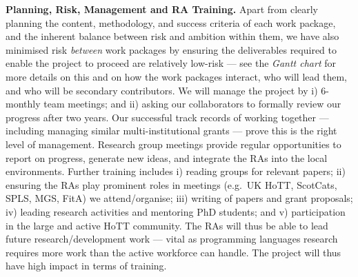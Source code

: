 \documentclass[a4paper,11pt]{article}
\newcommand{\eg}{{e.g.}\ }
\begin{document}
{\bf Planning, Risk, Management and RA Training.} Apart from clearly
planning the content, methodology, and success criteria of each work
package, and the inherent balance between risk and ambition within
them, we have also minimised risk {\em between} work packages by
ensuring the deliverables required to enable the project to proceed
are relatively low-risk --- see the {\em Gantt chart} for more details on
this and on how the work packages interact, who will lead them, and
who will be secondary contributors. We will manage the project by i)
6-monthly team meetings; and ii) asking our collaborators to formally
review our progress after two years.  Our successful
track records of working together --- including managing similar
multi-institutional grants --- prove this is the right level of
management. Research group meetings provide regular opportunities to
report on progress, generate new ideas, and integrate the RAs into the
local environments. Further training includes i) reading groups for
relevant papers; ii) ensuring the RAs play prominent roles in meetings
(\eg UK HoTT, ScotCats, SPLS, MGS, FitA) we attend/organise; iii)
writing of papers and grant proposals; iv) leading research activities
and mentoring PhD students; and v) participation in the large and
active HoTT community. The RAs will thus be able to lead future
research/development work --- vital as programming languages research
requires more work than the active workforce can handle. The
project will thus have high impact in terms of training.







\begin{footnotesize}
\begin{multicols}{2}

%
%

\end{multicols}
\end{footnotesize}

% 
% 
\end{document}

